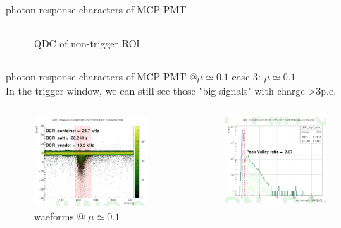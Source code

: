 \documentclass[11pt,compress,xcolor=x11names,UTF8]{beamer}
\begin{document}
\begin{frame}{photon response characters of MCP PMT }
\begin{columns}
\begin{column}{.475\textwidth}
\begin{figure}
\caption{QDC of non-trigger ROI}
\end{figure}
\end{column}
\end{columns}
\end{frame}
\begin{frame}{photon response characters of MCP PMT @$\mu\simeq 0.1$ }
	case 3: $\mu\simeq 0.1$\\
	In the trigger window, we can still see those "big signals" with charge >3p.e.
\begin{columns}
\begin{column}{.495\textwidth}
\begin{figure}
\centering
\includegraphics[width=0.94\textwidth]{figure/p1pewave.png} %
\caption{waeforms @ $\mu\simeq  0.1$}
\end{figure}
\end{column}
\begin{column}{.475\textwidth}
\begin{figure}
\centering
\includegraphics[width=0.94\textwidth]{figure/p1peqdc.png} %

\end{figure}
\end{column}
\end{columns}
\end{frame}
\end{document}
